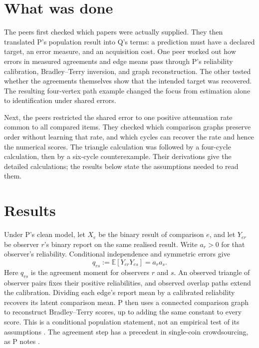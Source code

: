 \documentclass{article}
\begin{document}
\section{What was done}

The peers first checked which papers were actually supplied. They then translated P's population result into
Q's terms: a prediction must have a declared target, an error measure, and an acquisition cost. One peer
worked out how errors in measured agreements and edge means pass through P's reliability calibration,
Bradley--Terry inversion, and graph reconstruction. The other tested whether the agreements themselves show
that the intended target was recovered. The resulting four-vertex path example changed the focus from
estimation alone to identification under shared errors.

Next, the peers restricted the shared error to one positive attenuation rate common to all compared items.
They checked which comparison graphs preserve order without learning that rate, and which cycles can recover
the rate and hence the numerical scores. The triangle calculation was followed by a four-cycle calculation,
then by a six-cycle counterexample. Their derivations give the detailed calculations; the results below state
the assumptions needed to read them.

\section{Results}

Under P's clean model, let \(X_e\) be the binary result of comparison \(e\), and let \(Y_{er}\) be observer
\(r\)'s binary report on the same realised result. Write \(a_r>0\) for that observer's reliability.
Conditional independence and symmetric errors give
\[
q_{rs}:=\mathbb{E}[Y_{er}Y_{es}]=a_ra_s.
\]
Here \(q_{rs}\) is the agreement moment for observers \(r\) and \(s\). An observed triangle of observer pairs
fixes their positive reliabilities, and observed overlap paths extend the calibration. Dividing each edge's
report mean by a calibrated reliability recovers its latent comparison mean. P then uses a connected
comparison graph to reconstruct Bradley--Terry scores, up to adding the same constant to every score. This is
a conditional population statement, not an empirical test of its assumptions \cite{P}. The agreement step has
a precedent in single-coin crowdsourcing, as P notes \cite{P}.
\end{document}
